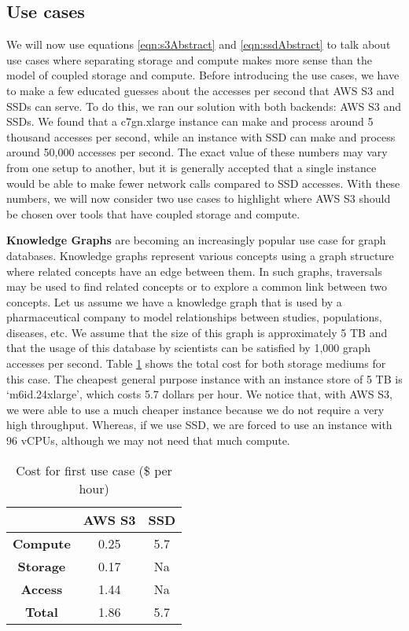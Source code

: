 \subsection{Use cases}\label{sec:useCases}
We will now use equations \ref{eqn:s3Abstract} and \ref{eqn:ssdAbstract} to talk
about use cases where separating storage and compute makes more sense than the
model of coupled storage and compute. Before introducing the use cases, we have
to make a few educated guesses about the accesses per second that AWS S3 and SSDs
can serve. To do this, we ran our solution with both backends: AWS S3 and SSDs.
We found that a c7gn.xlarge instance can make and process around 5
thousand accesses per second, while an instance with SSD can make and process
around 50,000  accesses per second. The exact value of these numbers may
vary from one setup to another, but it is generally accepted that a single
instance would be able to make fewer network calls compared to SSD accesses.
With these numbers, we will now consider two use cases to highlight where AWS S3
should be chosen over tools that have coupled storage and compute.

\medskip
\textbf{Knowledge Graphs} are becoming an increasingly popular use case for
graph databases. Knowledge graphs represent various concepts using a
graph structure where related concepts have an edge between them. In such
graphs, traversals may be used to find related concepts or to explore a common
link between two concepts. Let us assume we have a knowledge graph that is used
by a pharmaceutical company to model relationships between studies, populations,
diseases, etc. We assume that the size of this graph is approximately 5 TB and
that the usage of this database by scientists can be satisfied by 1,000
graph accesses per second. Table \ref{table:costKnowledgeGraphs} shows the total
cost for both storage mediums for this case. The cheapest general purpose
instance with an instance store of 5 TB is `m6id.24xlarge', which costs 5.7
dollars per hour. We notice that, with AWS S3, we were able to use a much
cheaper instance because we do not require a very high throughput. Whereas, if
we use SSD, we are forced to use an instance with 96 vCPUs, although we may
not need that much compute.

\begin{table}[h!]
 \centering
 \begin{tabular}{|c | c | c |} 
 \hline
  & AWS S3 & SSD \\ [0.5ex] 
 \hline\hline
     \textbf{Compute} & 0.25 & 5.7 \\ 
     \textbf{Storage} & 0.17 & Na \\
     \textbf{Access} &  1.44 & Na \\
     \hline
     \textbf{Total} & 1.86 & 5.7 \\
 \hline
 \end{tabular}
 \caption{Cost for first use case (\$ per hour)}
 \label{table:costKnowledgeGraphs}
\end{table}

